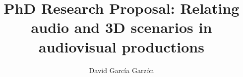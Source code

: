 \documentclass[a4paper,11pt]{article}
\begin{document}
\title{PhD Research Proposal: Relating audio and 3D scenarios in audiovisual productions}
\author{David García Garzón}
\maketitle



%
%


%
%
%
%
%
%




\appendix

\end{document}
